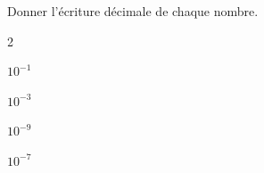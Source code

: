 \documentclass[exercice]{thedocument}%
\begin{document}
%
\begin{flushleft}
    Donner l'écriture décimale de chaque nombre.
\end{flushleft}
\begin{enumerate}
    \begin{multicols}{2}
        \item$10^{-1}$
        \item$10^{-3}$
        \item$10^{-9}$
        \item$10^{-7}$
    \end{multicols}
\end{enumerate}
\end{document}
